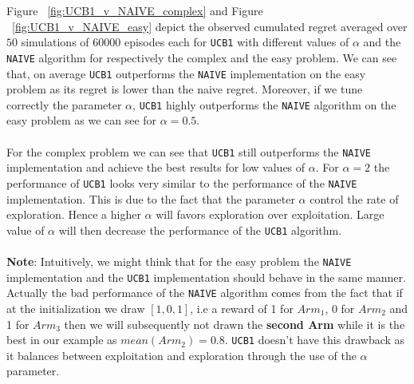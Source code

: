 \documentclass[11pt]{article}
\numberwithin{figure}{section} %
\begin{document}
Figure ~\ref{fig:UCB1_v_NAIVE_complex} and Figure ~\ref{fig:UCB1_v_NAIVE_easy} depict the observed cumulated regret averaged over $50$ simulations of $60000$ episodes each for \texttt{UCB1} with different values of $\alpha$ and the \texttt{NAIVE} algorithm for respectively the complex and the easy problem. We can see that, on average \texttt{UCB1} outperforms the \texttt{NAIVE} implementation on the easy problem as its regret is lower than the naive regret. Moreover, if we tune correctly the parameter $\alpha$, \texttt{UCB1} highly outperforms the \texttt{NAIVE} algorithm on the easy problem as we can see for $\alpha = 0.5$. \\
\\
For the complex problem we can see that \texttt{UCB1} still outperforms the \texttt{NAIVE} implementation and achieve the best results for low values of $\alpha$. For $\alpha = 2$ the performance of \texttt{UCB1} looks very similar to the performance of the \texttt{NAIVE} implementation. This is due to the fact that the parameter $\alpha$ control the rate of exploration. Hence a higher $\alpha$ will favors exploration over exploitation. Large value of $\alpha$ will then decrease the performance of the \texttt{UCB1} algorithm. \\
\\
\textbf{Note}: Intuitively, we might think that for the easy problem the \texttt{NAIVE} implementation and the \texttt{UCB1} implementation should behave in the same manner. Actually the bad performance of the \texttt{NAIVE} algorithm comes from the fact that if at the initialization we draw $[1,0,1]$, i.e a reward of 1 for $Arm_1$, 0 for $Arm_2$ and 1 for $Arm_3$ then we will subsequently not drawn the \textbf{second Arm} while it is the best in our example as $mean(Arm_2)=0.8$. \texttt{UCB1} doesn't have this drawback as it balances between exploitation and exploration through the use of the $\alpha$ parameter.
\end{document}
